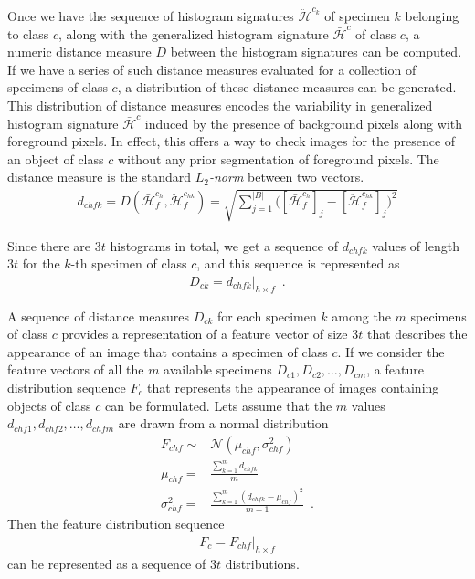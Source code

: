 Once we have the sequence of histogram signatures $\ddot{\mathcal{H}}^{c_{k}}$ of specimen $k$ belonging to class $c$, along with the generalized histogram signature $\bar{\mathcal{H}}^{c}$ of class $c$, a numeric distance measure $D$ between the histogram signatures can be computed. If we have a series of such distance measures evaluated for a collection of specimens of class $c$, a distribution of these distance measures can be generated. This distribution 
of distance measures encodes the variability in generalized histogram signature $\bar{\mathcal{H}}^{c}$ induced by the presence of background pixels along with foreground pixels. In effect, this offers a way to check images for the presence of an object of class $c$ without any prior segmentation of foreground pixels. The distance measure is the standard \emph{$L_2$-norm} between two vectors.
%
\begin{align}	\label{eqn:hist_signature_dist}
 d_{chfk} = D(\bar{\mathcal{H}}^{c_{h}}_f, \ddot{\mathcal{H}}^{c_{hk}}_f) 
 = \sqrt{\sum_{j=1}^{|B|}\Bigg(\left[\bar{\mathcal{H}}^{c_{h}}_f\right]_j
 -\left[\ddot{\mathcal{H}}^{c_{hk}}_f\right]_j\Bigg)^2}
\end{align}

Since there are $3t$ histograms in total, we get a sequence of $d_{chfk}$ values of length $3t$ for the $k$-th specimen of class $c$, and this sequence is represented as
%
\begin{align}	\label{eqn:dist_sequence}
 D_{ck}=d_{chfk}\Big|_{h\times f}\enspace .
\end{align}
%

A sequence of distance measures $D_{ck}$ for each specimen $k$ among the $m$ specimens of class $c$ provides a representation of a feature vector of size $3t$ that describes the appearance of an image that contains a specimen of class $c$. If we consider the feature vectors of all the $m$ available specimens $D_{c1},D_{c2},\ldots,D_{cm}$, a feature distribution sequence $F_c$ that represents the appearance of images containing objects of class $c$ can be formulated. Lets assume that the $m$ values $d_{chf1}, d_{chf2},\ldots,d_{chfm}$ are drawn from a normal distribution 
%
\begin{align}
 F_{chf}\sim &\mathcal{N}(\mu_{chf},\sigma^2_{chf})\label{eqn:normal_distr}\\
 \mu_{chf}= &\frac{\sum_{k=1}^m d_{chfk}}{m}\label{eqn:normal_mean}\\
 \sigma^2_{chf}= &\frac{\sum_{k=1}^m (d_{chfk}-\mu_{chf})^2}{m-1}\label{eqn:normal_stddev}\enspace .
\end{align}
%
Then the feature distribution sequence
\begin{align}	\label{eqn:feat_distribution}
 F_c=F_{chf}\Big|_{h \times f}
\end{align}
can be represented as a sequence of $3t$ distributions. 

